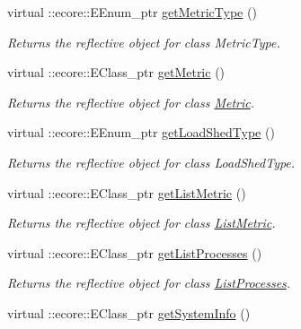 \begin{DoxyCompactItemize}
\item 
virtual ::ecore::EEnum\_\-ptr \hyperlink{classIMS__Data_1_1IMS__DataPackage_aab85cb8895fed711e0a70a51297efad3}{getMetricType} ()
\begin{DoxyCompactList}\small\item\em Returns the reflective object for class MetricType. \item\end{DoxyCompactList}\item 
virtual ::ecore::EClass\_\-ptr \hyperlink{classIMS__Data_1_1IMS__DataPackage_ac061eb6dd0c1236d628e8d78c26d03d6}{getMetric} ()
\begin{DoxyCompactList}\small\item\em Returns the reflective object for class \hyperlink{classIMS__Data_1_1Metric}{Metric}. \item\end{DoxyCompactList}\item 
virtual ::ecore::EEnum\_\-ptr \hyperlink{classIMS__Data_1_1IMS__DataPackage_a5a77354e8a0164b9aac0a3c5a0070581}{getLoadShedType} ()
\begin{DoxyCompactList}\small\item\em Returns the reflective object for class LoadShedType. \item\end{DoxyCompactList}\item 
virtual ::ecore::EClass\_\-ptr \hyperlink{classIMS__Data_1_1IMS__DataPackage_a86424a667690554a4c46ccc0e21507e2}{getListMetric} ()
\begin{DoxyCompactList}\small\item\em Returns the reflective object for class \hyperlink{classIMS__Data_1_1ListMetric}{ListMetric}. \item\end{DoxyCompactList}\item 
virtual ::ecore::EClass\_\-ptr \hyperlink{classIMS__Data_1_1IMS__DataPackage_a17f2fd4e9533c0fbbadf8ac3df2c230a}{getListProcesses} ()
\begin{DoxyCompactList}\small\item\em Returns the reflective object for class \hyperlink{classIMS__Data_1_1ListProcesses}{ListProcesses}. \item\end{DoxyCompactList}\item 
virtual ::ecore::EClass\_\-ptr \hyperlink{classIMS__Data_1_1IMS__DataPackage_aef5db1474e1898a2156560c562dbd72b}{getSystemInfo} ()

\end{DoxyCompactItemize}
